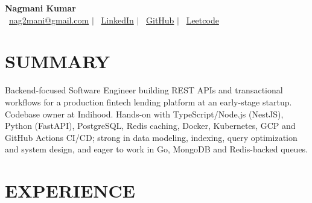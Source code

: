\documentclass[a4paper,10pt]{article}
\begin{document}
\pagestyle{empty}

\begin{center}
    \textbf{\huge Nagmani Kumar} \\[5pt]
    \faEnvelope \, \href{mailto:nag2mani@gmail.com}{nag2mani@gmail.com} \hspace{2pt} $|$ \hspace{2pt}
    \faLinkedinSquare \, \href{https://www.linkedin.com/in/nag2mani/}{LinkedIn} \hspace{2pt} $|$ \hspace{2pt}
    \faGithub \, \href{https://github.com/nag2mani}{GitHub} \hspace{2pt} $|$ \hspace{2pt}
    \faCode \, \href{https://leetcode.com/nag2mani/}{Leetcode}
\end{center}

\section*{SUMMARY}
Backend-focused Software Engineer building REST APIs and transactional workflows for a production fintech lending platform at an early-stage startup.
Codebase owner at Indihood. Hands-on with TypeScript/Node.js (NestJS), Python (FastAPI), PostgreSQL, Redis caching, Docker, Kubernetes, GCP and GitHub Actions CI/CD; strong in data modeling,
indexing, query optimization and system design, and eager to work in Go, MongoDB and Redis-backed queues.

\section*{EXPERIENCE}
\end{document}
